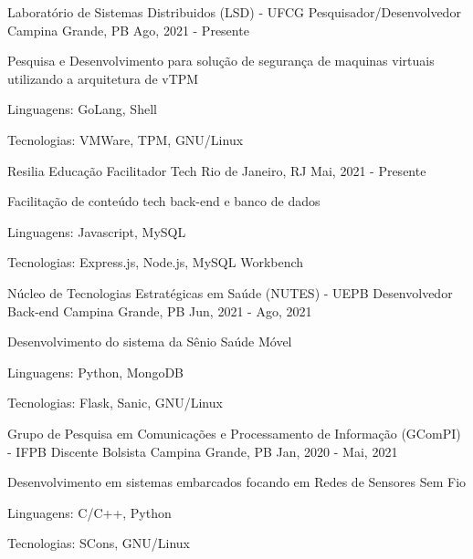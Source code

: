 
\begin{cventries}
  \cventry
  {Laboratório de Sistemas Distribuidos (LSD) - UFCG} %
  {Pesquisador/Desenvolvedor} %
  {Campina Grande, PB} %
  {Ago, 2021 - Presente} %
  {
    \begin{cvitems} %
      \item {Pesquisa e Desenvolvimento para solução de segurança de maquinas virtuais utilizando a arquitetura de vTPM}
      \item {Linguagens: GoLang, Shell}
      \item {Tecnologias: VMWare, TPM, GNU/Linux}
    \end{cvitems}
  }

  \cventry
  {Resilia Educação } %
  {Facilitador Tech} %
  {Rio de Janeiro, RJ} %
  {Mai, 2021 - Presente} %
  {
    \begin{cvitems} %
      \item {Facilitação de conteúdo tech back-end e banco de dados}
      \item {Linguagens: Javascript, MySQL}
      \item {Tecnologias: Express.js, Node.js, MySQL Workbench}
    \end{cvitems}
  }

  \cventry
  {Núcleo de Tecnologias Estratégicas em Saúde (NUTES) - UEPB} %
  {Desenvolvedor Back-end} %
  {Campina Grande, PB} %
  {Jun, 2021 - Ago, 2021} %
  {
    \begin{cvitems} %
      \item {Desenvolvimento do sistema da Sênio Saúde Móvel}
      \item {Linguagens: Python, MongoDB}
      \item {Tecnologias: Flask, Sanic, GNU/Linux}
    \end{cvitems}
  }

  \cventry
  {Grupo de Pesquisa em Comunicações e Processamento de Informação (GComPI) - IFPB} %
  {Discente Bolsista} %
  {Campina Grande, PB} %
  {Jan, 2020 - Mai, 2021} %
  {
    \begin{cvitems} %
      \item {Desenvolvimento em sistemas embarcados focando em Redes de Sensores Sem Fio}
      \item {Linguagens: C/C++, Python}
      \item {Tecnologias: SCons, GNU/Linux}
    \end{cvitems}
  }


\end{cventries}
